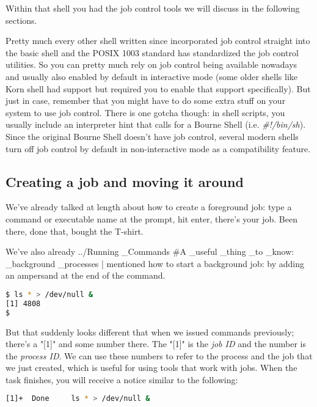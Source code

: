 Within that shell you had the job control tools we will discuss in the
following sections.

Pretty much every other shell written since incorporated job control straight
into the basic shell and the POSIX 1003 standard has standardized the job
control utilities. So you can pretty much rely on job control being available
nowadays and usually also enabled by default in interactive mode (some older
shells like Korn shell had support but required you to enable that support
specifically). But just in case, remember that you might have to do some extra
stuff on your system to use job control. There is one gotcha though: in shell
scripts, you usually include an interpreter hint that calls for a Bourne Shell
(i.e. \textit{\#!/bin/sh}). Since the original Bourne Shell doesn't have job
control, several modern shells turn off job control by default in
non-interactive mode as a compatibility feature.

\subsection{Creating a job and moving it around}
We've already talked at length about how to create a foreground job: type a
command or executable name at the prompt, hit enter, there's your job. Been
there, done that, bought the T-shirt.

We've also already ../Running \_Commands \#A \_useful \_thing \_to \_know:
\_background \_processes | mentioned how to start a background job: by adding
an ampersand at the end of the command.
\lstset{basicstyle=\scriptsize, numbers=left, captionpos=b, tabsize=4}
\begin{lstlisting}[caption=Creating a background job,language={bash},
xleftmargin=15pt,label=lst:creatingabackgroundjob]
$ ls * > /dev/null &
[1] 4808
$
\end{lstlisting}

But that suddenly looks different that when we issued commands previously;
there's a "[1]" and some number there. The "[1]" is the \textit{job ID} and the
number is the \textit{process ID}. We can use these numbers to refer to the
process and the job that we just created, which is useful for using tools that
work with jobs. When the task finishes, you will receive a notice similar to
the following:
\lstset{basicstyle=\scriptsize, numbers=left, captionpos=b, tabsize=4}
\begin{lstlisting}[caption=Job done,language={bash},
xleftmargin=15pt, label=lst:Job done]
[1]+  Done     ls * > /dev/null &
\end{lstlisting}

